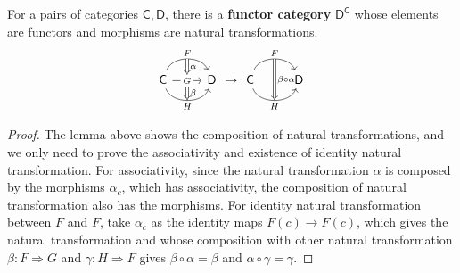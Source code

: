 \begin{cor} For a pairs of categories $\mathsf{C},\mathsf{D}$, there is a \textbf{functor category} $\mathsf{D}^\mathsf{C}$ whose elements are functors and morphisms are natural transformations.
\begin{equation}
\begin{tikzcd}
\mathsf{C}\arrow[r,bend left=70, "F"{name=f}] \arrow[r, "G"{name=g, description}] \arrow[r,swap, bend right=70, "H"{name=h}] & \mathsf{D}\arrow[Rightarrow, from=f, to=g, "\alpha"] \arrow[Rightarrow, from=g, to=h, "\beta"]
\end{tikzcd}\rightarrow\begin{tikzcd}
\mathsf{C}\arrow[r,bend left=70, "F"{name=f}] \arrow[r,swap, bend right=70, "H"{name=h}] & \mathsf{D}\arrow[Rightarrow, from=f, to=h, "\beta\circ\alpha"]
\end{tikzcd}
\end{equation}
\end{cor}
\begin{proof}
The lemma above shows the composition of natural transformations, and we only need to prove the associativity and existence of identity natural transformation. For associativity, since the natural transformation $\alpha$ is composed by the morphisms $\alpha_c$, which has associativity, the composition of natural transformation also has the morphisms. For identity natural transformation between $F$ and $F$, take $\alpha_c$ as the identity maps $F(c)\rightarrow F(c)$, which gives the natural transformation and whose composition with other natural transformation $\beta:F\Rightarrow G$ and $\gamma:H\Rightarrow F$ gives $\beta\circ \alpha=\beta$ and $\alpha\circ \gamma=\gamma$.
\end{proof}

